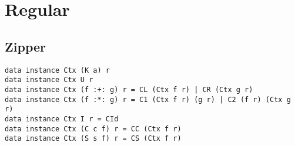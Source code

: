 \chapter{Regular}

\section{Zipper}
\begin{verbatim}
data instance Ctx (K a) r
data instance Ctx U r
data instance Ctx (f :+: g) r = CL (Ctx f r) | CR (Ctx g r)
data instance Ctx (f :*: g) r = C1 (Ctx f r) (g r) | C2 (f r) (Ctx g r)
data instance Ctx I r = CId
data instance Ctx (C c f) r = CC (Ctx f r)
data instance Ctx (S s f) r = CS (Ctx f r)
\end{verbatim}